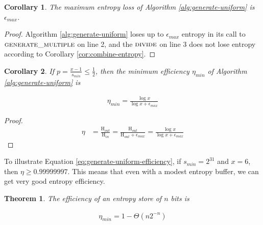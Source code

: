 \documentclass[lettersize,journal]{IEEEtran}
\newtheorem{corollary}{Corollary}
\newtheorem{theorem}{Theorem}
\newcommand{\Entropy}{\mathrm{H}}
\begin{document}
\begin{corollary}
    The maximum entropy loss of Algorithm \ref{alg:generate-uniform} is $\epsilon_{max}$.
\end{corollary}

\begin{proof}
    Algorithm \ref{alg:generate-uniform} loses up to $\epsilon_{max}$ entropy in its call to $\textsc{generate\_multiple}$ on line 2, and the $\textsc{divide}$ on line 3 does not lose entropy according to Corollary \ref{cor:combine-entropy}.
\end{proof}

\begin{corollary}
    If $p = \frac{x-1}{s_{min}} \le \frac{1}{2}$, then the minimum efficiency $\eta_{min}$ of Algorithm \ref{alg:generate-uniform} is 

\begin{align}
    \label{eq:generate-uniform-efficiency}
    \eta_{min} = \frac{\log x}{\log x + \epsilon_{max}}
\end{align}
\end{corollary}

\begin{proof}
\begin{align}
    \eta & = \frac{\Entropy_{out}}{\Entropy_{in}}
          = \frac{\Entropy_{out}}{\Entropy_{out}+\epsilon_{max}} 
          = \frac{\log x}{\log x + \epsilon_{max}}
\end{align}
\end{proof}

To illustrate Equation \ref{eq:generate-uniform-efficiency}, if $s_{min}=2^{31}$ and $x=6$, then $\eta \ge 0.99999997$. This means that even with a modest entropy buffer, we can get very good entropy efficiency.

\begin{theorem}

The efficiency of an entropy store of $n$ bits is 

\begin{align}
\eta_{min} = 1 - \Theta(n2^{-n})
\end{align}

\end{theorem}
\end{document}
